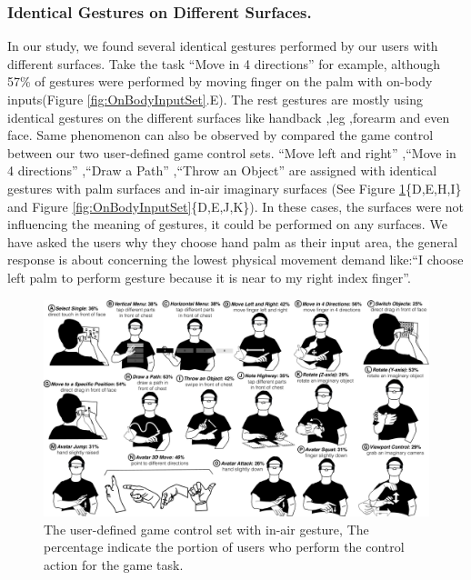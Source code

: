 \documentclass{sigchi}
\begin{document}
\subsubsection{Identical Gestures on Different Surfaces.}
 In our study, we found several identical gestures performed by our users with different surfaces. Take the task ``Move in 4 directions'' for example, although 57\% of gestures were performed by moving finger on the palm with on-body inputs(Figure \ref{fig:OnBodyInputSet}.E). The rest gestures are mostly using identical gestures on the different surfaces like handback ,leg ,forearm and even face. Same phenomenon can also be observed by compared the game control between our two user-defined game control sets. ``Move left and right'' ,``Move in 4 directions'' ,``Draw a Path'' ,``Throw an Object'' are assigned with identical gestures with palm surfaces and in-air imaginary surfaces (See Figure \ref{fig:InAirSet}\{D,E,H,I\} and Figure \ref{fig:OnBodyInputSet}\{D,E,J,K\}). In these cases, the surfaces were not influencing the meaning of gestures, it could be performed on any surfaces. We have asked the users why they choose hand palm as their input area, the general response is about concerning the lowest physical movement demand like:``I choose left palm to perform gesture because it is near to my right index finger''.


  \begin{figure}
  \centering
  \includegraphics[width=1\textwidth]{InAirSet.pdf}
  \caption{The user-defined game control set with in-air gesture, The percentage indicate the portion of users who perform the control action for the game task.}
  \label{fig:InAirSet}
  \end{figure}
\end{document}
